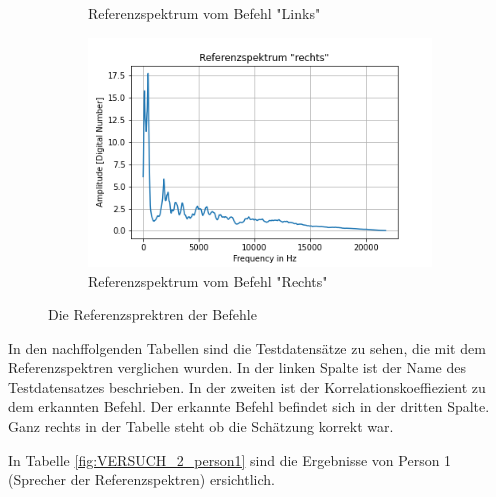 \documentclass[12pt, oneside, a4paper, \docLanguage]{report}
\begin{document}
\begin{figure}[H]
\begin{subfigure}{.5\textwidth}
  		\caption{Referenzspektrum vom Befehl "Links"}
  		\label{fig:VERSUCH_2_sub7}
	\end{subfigure}%
	\begin{subfigure}{.5\textwidth}
  		\centering
 		 \includegraphics[width=.95\linewidth]{media/ReferenzspektrumRechts.png}
  		\caption{Referenzspektrum vom Befehl "Rechts"}
  		\label{fig:VERSUCH_2_sub8}
	\end{subfigure}
	\caption{Die Referenzsprektren der Befehle}
	\label{fig:VERSUCH_2_referencsSpecs}
\end{figure}

In den nachffolgenden Tabellen sind die Testdatensätze zu sehen, die mit dem Referenzspektren verglichen wurden. In der linken Spalte ist der Name des Testdatensatzes beschrieben. In der zweiten ist der Korrelationskoeffiezient zu dem erkannten Befehl. Der erkannte Befehl befindet sich in der dritten Spalte. Ganz rechts in der Tabelle steht ob die Schätzung korrekt war.

\newpage
In Tabelle \ref{fig:VERSUCH_2_person1} sind die Ergebnisse von Person 1 (Sprecher der Referenzspektren) ersichtlich.
\end{document}
